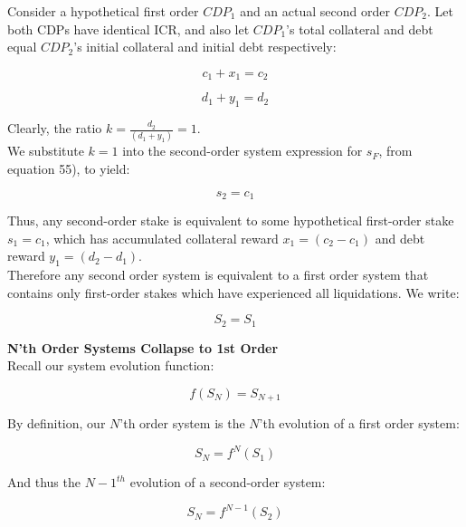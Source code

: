 \documentclass[reqno]{article}
\begin{document}
Consider a hypothetical first order $CDP_1$ and an actual second order $CDP_2$. Let both CDPs have identical ICR, and also let $CDP_1$’s total collateral and debt equal $CDP_2$’s initial collateral and initial debt respectively:

\begin{equation} 
    c_1+x_1=c_2
\end{equation}

\begin{equation} 
    d_1+y_1=d_2
\end{equation}

\bigskip
Clearly, the ratio  $k = \frac{d_2}{(d_1+y_1)} = 1$.\\

We substitute $k=1$ into the second-order system expression for $s_F$, from equation 55), to yield:

\begin{equation} 
    s_2=c_1
\end{equation}

\bigskip
Thus, any second-order stake is equivalent to some hypothetical first-order stake $s_1=c_1$, which has accumulated collateral reward $x_1=(c_2-c_1)$ and debt reward $y_1=(d_2-d_1)$.\\

Therefore any second order system is equivalent to a first order system that contains only first-order stakes which have experienced all liquidations. We write:

\begin{equation} 
    S_2=S_1
\end{equation}

\bigskip
\textbf{N’th Order Systems Collapse to 1st Order}\\
Recall our system evolution function: 

\begin{equation} 
    f(S_N)=S_{N+1}
\end{equation}

\bigskip
By definition, our $N$’th order system is the $N$’th evolution of a first order system:

\begin{equation} 
    S_N=f^N(S_1)
\end{equation}

\bigskip
And thus the $N-1^{th}$ evolution of a second-order system:

\begin{equation} 
    S_N=f^{N-1}(S_2)
\end{equation}
\end{document}
